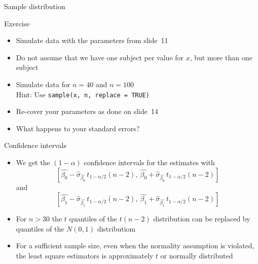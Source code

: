 \documentclass[aspectratio=169]{beamer}
\begin{document}
\begin{frame}{Sample distribution}
  \begin{center}
  \end{center}
\end{frame}

\begin{frame}{}
  \begin{block}{Exercise}
    \begin{itemize}
      \item Simulate data with the parameters from slide~11
      \item Do not assume that we have one subject per value for $x$, but
        more than one subject
      \item Simulate data for $n=40$ and $n=100$\\
        Hint: Use \texttt{sample(x, n, replace = TRUE)}
      \item Re-cover your parameters as done on slide~14
      \item What happens to your standard errors?
    \end{itemize}
  \end{block}
\end{frame}

\begin{frame}{Confidence intervals}
  \begin{itemize}
    \item We get the $(1-\alpha)$ confidence intervals for the estimates with
\[
  \left[\hat{\beta_0} - \hat{\sigma}_{\hat{\beta_0}} \, t_{1-\alpha/2} (n-2),~
  \hat{\beta_0} + \hat{\sigma}_{\hat{\beta_0}} \, t_{1-\alpha/2} (n-2)\right]
\]
and
\[
  \left[\hat{\beta_1} - \hat{\sigma}_{\hat{\beta_1}} \, t_{1-\alpha/2} (n-2),~
  \hat{\beta_1} + \hat{\sigma}_{\hat{\beta_1}} \, t_{1-\alpha/2} (n-2)\right]
\]
  \item For $n > 30$ the $t$ quantiles of the $t(n-2)$ distribution can be
    replaced by quantiles of the $N(0,1)$ distributiom

  \item For a sufficient sample size, even when the normality assumption is
    violated, the least square estimators is approximately $t$ or normally
      distributed
  \end{itemize}
\end{frame}
\end{document}
